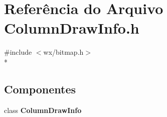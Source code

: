 \section{Referência do Arquivo Column\+Draw\+Info.\+h}
\label{_column_draw_info_8h}
{\ttfamily \#include $<$wx/bitmap.\+h$>$}\\*
\subsection*{Componentes}
\begin{DoxyCompactItemize}
\item 
class {\bf Column\+Draw\+Info}
\end{DoxyCompactItemize}
